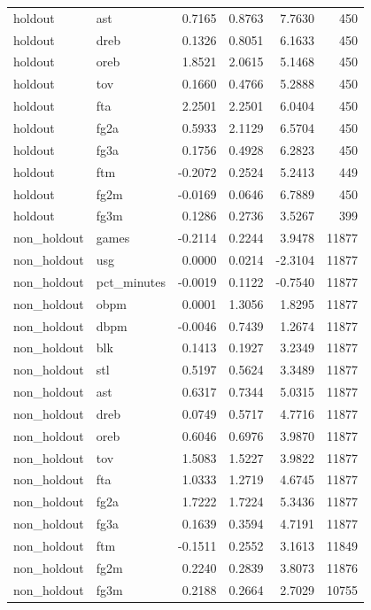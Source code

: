 \begin{table}
\begin{tabular}{llrrrr}
holdout & ast & 0.7165 & 0.8763 & 7.7630 & 450 \\
holdout & dreb & 0.1326 & 0.8051 & 6.1633 & 450 \\
holdout & oreb & 1.8521 & 2.0615 & 5.1468 & 450 \\
holdout & tov & 0.1660 & 0.4766 & 5.2888 & 450 \\
holdout & fta & 2.2501 & 2.2501 & 6.0404 & 450 \\
holdout & fg2a & 0.5933 & 2.1129 & 6.5704 & 450 \\
holdout & fg3a & 0.1756 & 0.4928 & 6.2823 & 450 \\
holdout & ftm & -0.2072 & 0.2524 & 5.2413 & 449 \\
holdout & fg2m & -0.0169 & 0.0646 & 6.7889 & 450 \\
holdout & fg3m & 0.1286 & 0.2736 & 3.5267 & 399 \\
non\_holdout & games & -0.2114 & 0.2244 & 3.9478 & 11877 \\
non\_holdout & usg & 0.0000 & 0.0214 & -2.3104 & 11877 \\
non\_holdout & pct\_minutes & -0.0019 & 0.1122 & -0.7540 & 11877 \\
non\_holdout & obpm & 0.0001 & 1.3056 & 1.8295 & 11877 \\
non\_holdout & dbpm & -0.0046 & 0.7439 & 1.2674 & 11877 \\
non\_holdout & blk & 0.1413 & 0.1927 & 3.2349 & 11877 \\
non\_holdout & stl & 0.5197 & 0.5624 & 3.3489 & 11877 \\
non\_holdout & ast & 0.6317 & 0.7344 & 5.0315 & 11877 \\
non\_holdout & dreb & 0.0749 & 0.5717 & 4.7716 & 11877 \\
non\_holdout & oreb & 0.6046 & 0.6976 & 3.9870 & 11877 \\
non\_holdout & tov & 1.5083 & 1.5227 & 3.9822 & 11877 \\
non\_holdout & fta & 1.0333 & 1.2719 & 4.6745 & 11877 \\
non\_holdout & fg2a & 1.7222 & 1.7224 & 5.3436 & 11877 \\
non\_holdout & fg3a & 0.1639 & 0.3594 & 4.7191 & 11877 \\
non\_holdout & ftm & -0.1511 & 0.2552 & 3.1613 & 11849 \\
non\_holdout & fg2m & 0.2240 & 0.2839 & 3.8073 & 11876 \\
non\_holdout & fg3m & 0.2188 & 0.2664 & 2.7029 & 10755 \\
\bottomrule
\end{tabular}
\end{table}
